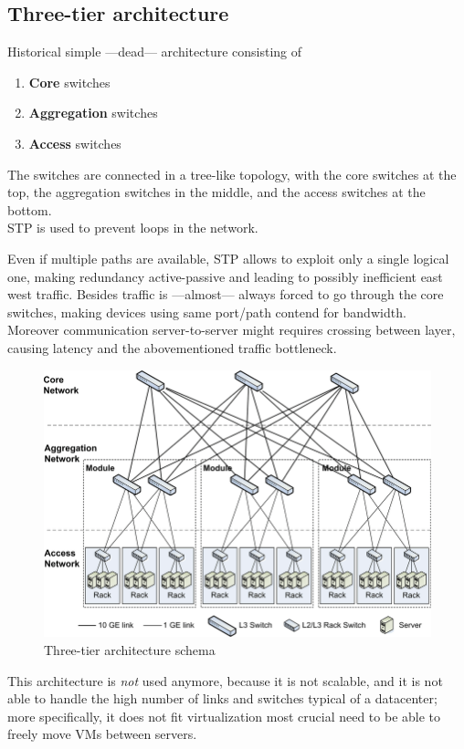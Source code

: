 \subsection{Three-tier architecture}
\begin{paracol}{2}
   
   {Historical simple ---dead--- architecture consisting of
   \ns
   \begin{enumerate}
      \item \textbf{Core} switches
      \item \textbf{Aggregation} switches
      \item \textbf{Access} switches
   \end{enumerate}}
   The switches are connected in a tree-like topology, with the core switches at the top, the aggregation switches in the middle, and the access switches at the bottom.\\
   STP is used to prevent loops in the network.

   Even if multiple paths are available, STP allows to exploit only a single logical one, making redundancy active-passive and leading to possibly inefficient east west traffic. 
   Besides traffic is ---almost--- always forced to go through the core switches, making devices using same port/path contend for bandwidth.\\
   Moreover communication server-to-server might requires crossing between layer, causing latency and the abovementioned traffic bottleneck.
   
   \switchcolumn
   
   \colfill
   \begin{figure}[htbp]
      \centering
      \includegraphics{images/3tier_switches.png}
      \caption{Three-tier architecture schema}
      \label{fig:3tier_switches}
   \end{figure}
   \colfill
   
\end{paracol}
This architecture is \textit{not} used anymore, because it is not scalable, and it is not able to handle the high number of links and switches typical of a datacenter; more specifically, it does not fit virtualization most crucial need to be able to freely move VMs between servers.

